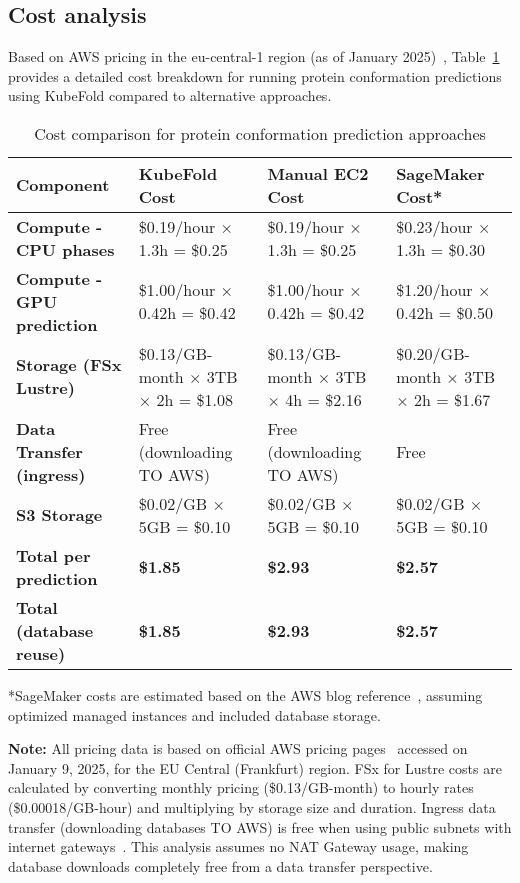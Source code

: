 \subsection{Cost analysis}

Based on AWS pricing in the eu-central-1 region (as of January 2025)~\cite{aws-ec2-pricing,aws-fsx-pricing}, Table~\ref{tab:cost_analysis} provides a detailed cost breakdown for running protein conformation predictions using KubeFold compared to alternative approaches.

\begin{table}[H]
    \centering
    \small
    \begin{tabularx}{\textwidth}{|X|X|X|X|}
        \hline
        \textbf{Component} & \textbf{KubeFold Cost} & \textbf{Manual EC2 Cost} & \textbf{SageMaker Cost*} \\
        \hline
        \textbf{Compute - CPU phases} & \$0.19/hour × 1.3h = \$0.25 & \$0.19/hour × 1.3h = \$0.25 & \$0.23/hour × 1.3h = \$0.30 \\
        \hline
        \textbf{Compute - GPU prediction} & \$1.00/hour × 0.42h = \$0.42 & \$1.00/hour × 0.42h = \$0.42 & \$1.20/hour × 0.42h = \$0.50 \\
        \hline
        \textbf{Storage (FSx Lustre)} & \$0.13/GB-month × 3TB × 2h = \$1.08 & \$0.13/GB-month × 3TB × 4h = \$2.16 & \$0.20/GB-month × 3TB × 2h = \$1.67 \\
        \hline
        \textbf{Data Transfer (ingress)} & Free (downloading TO AWS) & Free (downloading TO AWS) & Free \\
        \hline
        \textbf{S3 Storage} & \$0.02/GB × 5GB = \$0.10 & \$0.02/GB × 5GB = \$0.10 & \$0.02/GB × 5GB = \$0.10 \\
        \hline
        \textbf{Total per prediction} & \textbf{\$1.85} & \textbf{\$2.93} & \textbf{\$2.57} \\
        \hline
        \textbf{Total (database reuse)} & \textbf{\$1.85} & \textbf{\$2.93} & \textbf{\$2.57} \\
        \hline
    \end{tabularx}
    \caption{Cost comparison for protein conformation prediction approaches}
    \label{tab:cost_analysis}
\end{table}

*SageMaker costs are estimated based on the AWS blog reference~\cite{aws-sagemaker-protein-folding}, assuming optimized managed instances and included database storage.

\textbf{Note:} All pricing data is based on official AWS pricing pages~\cite{aws-ec2-pricing,aws-fsx-pricing} accessed on January 9, 2025, for the EU Central (Frankfurt) region. FSx for Lustre costs are calculated by converting monthly pricing (\$0.13/GB-month) to hourly rates (\$0.00018/GB-hour) and multiplying by storage size and duration. Ingress data transfer (downloading databases TO AWS) is free when using public subnets with internet gateways~\cite{aws-ec2-pricing}. This analysis assumes no NAT Gateway usage, making database downloads completely free from a data transfer perspective.

